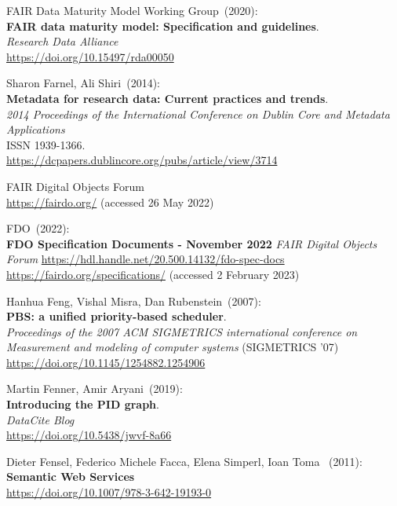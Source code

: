 \begin{thebibliography}{9}
FAIR Data Maturity Model Working Group~(2020): \\
\textbf{FAIR data maturity model: Specification and guidelines}.\\
\emph{Research Data Alliance}\\
\url{https://doi.org/10.15497/rda00050}

Sharon Farnel, Ali Shiri~(2014): \\
\textbf{Metadata for research data: Current practices and trends}.\\
\emph{2014 Proceedings of the International Conference on Dublin Core
and Metadata Applications}\\
ISSN 1939-1366.\\
\url{https://dcpapers.dublincore.org/pubs/article/view/3714}

{FAIR Digital Objects Forum} \\
\url{https://fairdo.org/} (accessed 26 May 2022)

FDO~(2022): \\
\textbf{{FDO Specification Documents - November 2022}}
\emph{FAIR Digital Objects Forum}
\url{https://hdl.handle.net/20.500.14132/fdo-spec-docs}\\
\url{https://fairdo.org/specifications/} 
(accessed 2 February 2023) 

Hanhua Feng, Vishal Misra, Dan Rubenstein~(2007): \\
\textbf{PBS: a unified priority-based scheduler}.\\
\emph{Proceedings of the 2007 ACM SIGMETRICS international conference on Measurement and modeling of computer systems} (SIGMETRICS '07)\\
\url{https://doi.org/10.1145/1254882.1254906} 

Martin Fenner, Amir Aryani~(2019): \\
\textbf{Introducing the PID graph}. \\
\emph{DataCite Blog}\\
\url{https://doi.org/10.5438/jwvf-8a66}

Dieter Fensel, Federico Michele Facca, Elena Simperl, Ioan Toma
~(2011): \\
\textbf{Semantic {Web Services}}\\
\url{https://doi.org/10.1007/978-3-642-19193-0}


\end{thebibliography}
